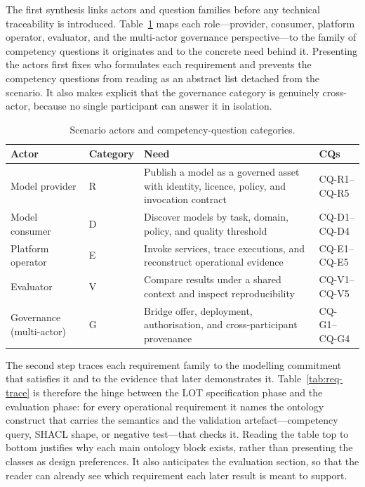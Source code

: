 \documentclass[Afour,sagev,times]{sagej}
\newcommand{\cq}[1]{\textsf{#1}}
\begin{document}
The first synthesis links actors and question families before any technical traceability is introduced. Table~\ref{tab:actors} maps each role---provider, consumer, platform operator, evaluator, and the multi-actor governance perspective---to the family of competency questions it originates and to the concrete need behind it. Presenting the actors first fixes who formulates each requirement and prevents the competency questions from reading as an abstract list detached from the scenario. It also makes explicit that the governance category is genuinely cross-actor, because no single participant can answer it in isolation.

\begin{table}[tb]
\small\sf\centering
\caption{Scenario actors and competency-question categories.\label{tab:actors}}
\begin{tabular}{@{}p{3.5cm}p{2cm}p{7cm}p{2.5cm}@{}}
\toprule
\textbf{Actor} & \textbf{Category} & \textbf{Need} & \textbf{CQs} \\
\midrule
Model provider & R & Publish a model as a governed asset with identity, licence, policy, and invocation contract & \cq{CQ-R1}--\cq{CQ-R5} \\
Model consumer & D & Discover models by task, domain, policy, and quality threshold & \cq{CQ-D1}--\cq{CQ-D4} \\
Platform operator & E & Invoke services, trace executions, and reconstruct operational evidence & \cq{CQ-E1}--\cq{CQ-E5} \\
Evaluator & V & Compare results under a shared context and inspect reproducibility & \cq{CQ-V1}--\cq{CQ-V5} \\
Governance (multi-actor) & G & Bridge offer, deployment, authorisation, and cross-participant provenance & \cq{CQ-G1}--\cq{CQ-G4} \\
\bottomrule
\end{tabular}
\end{table}

The second step traces each requirement family to the modelling commitment that satisfies it and to the evidence that later demonstrates it. Table~\ref{tab:req-trace} is therefore the hinge between the LOT specification phase and the evaluation phase: for every operational requirement it names the ontology construct that carries the semantics and the validation artefact---competency query, SHACL shape, or negative test---that checks it. Reading the table top to bottom justifies why each main ontology block exists, rather than presenting the classes as design preferences. It also anticipates the evaluation section, so that the reader can already see which requirement each later result is meant to support.
\end{document}
